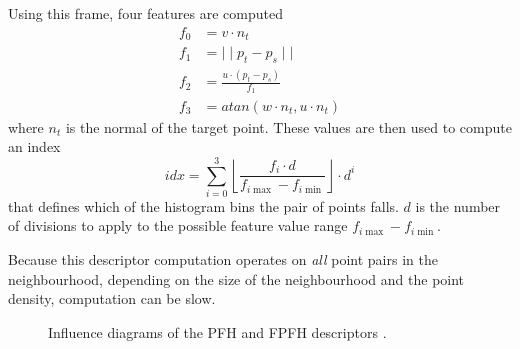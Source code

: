 \documentclass[11pt,a4paper]{kth-mag}
\begin{document}
Using this frame, four features are computed
\begin{align}
  \label{eq:20}
  f_0&=v\cdot n_t\\
  f_1&=\mid\mid p_t - p_s\mid\mid\\
  f_2&=\frac{u\cdot(p_t-p_s)}{f_1}\\
  f_3&=atan(w\cdot n_t,u\cdot n_t)
\end{align}
where $n_t$ is the normal of the target point. These values are then used to
compute an index
\begin{equation}
  \label{eq:21}
  idx=\sum^3_{i=0}\left\lfloor \frac{f_i\cdot d}{f_{i\max}-f_{i\min}}\right\rfloor\cdot d^i
\end{equation}
that defines which of the histogram bins the pair of points falls. $d$ is the
number of divisions to apply to the possible feature value range
$f_{i\max}-f_{i\min}$.

Because this descriptor computation operates on \emph{all} point pairs in the
neighbourhood, depending on the size of the neighbourhood and the point density,
computation can be slow.
\begin{figure}
  \centering
  \caption{Influence diagrams of the PFH and FPFH descriptors \cite{rusu2009fast}.}
  \label{fig:pfhinfluence}
\end{figure}
\end{document}
